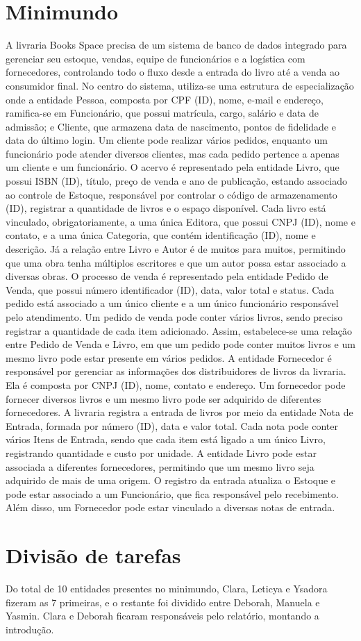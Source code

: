 \documentclass{article}
\begin{document}
\section{Minimundo}
A livraria Books Space precisa de um sistema de banco de dados integrado para gerenciar seu estoque, vendas, equipe de funcionários e a logística com fornecedores, controlando todo o fluxo desde a entrada do livro até a venda ao consumidor final. No centro do sistema, utiliza-se uma estrutura de especialização onde a entidade Pessoa, composta por CPF (ID), nome, e-mail e endereço, ramifica-se em Funcionário, que possui matrícula, cargo, salário e data de admissão; e Cliente, que armazena data de nascimento, pontos de fidelidade e data do último login. Um cliente pode realizar vários pedidos, enquanto um funcionário pode atender diversos clientes, mas cada pedido pertence a apenas um cliente e um funcionário. O acervo é representado pela entidade Livro, que possui ISBN (ID), título, preço de venda e ano de publicação, estando associado ao controle de Estoque, responsável por controlar o código de armazenamento (ID), registrar a quantidade de livros e o espaço disponível. Cada livro está vinculado, obrigatoriamente, a uma única Editora, que possui CNPJ (ID), nome e contato, e a uma única Categoria, que contém identificação (ID), nome e descrição. Já a relação entre Livro e Autor é de muitos para muitos, permitindo que uma obra tenha múltiplos escritores e que um autor possa estar associado a diversas obras. O processo de venda é representado pela entidade Pedido de Venda, que possui número identificador (ID), data, valor total e status. Cada pedido está associado a um único cliente e a um único funcionário responsável pelo atendimento. Um pedido de venda pode conter vários livros, sendo preciso registrar a quantidade de cada item adicionado. Assim, estabelece-se uma relação entre Pedido de Venda e Livro, em que um pedido pode conter muitos livros e um mesmo livro pode estar presente em vários pedidos. A entidade Fornecedor é responsável por gerenciar as informações dos distribuidores de livros da livraria. Ela é composta por CNPJ (ID), nome, contato e endereço. Um fornecedor pode fornecer diversos livros e um mesmo livro pode ser adquirido de diferentes fornecedores. A livraria registra a entrada de livros por meio da entidade Nota de Entrada, formada por número (ID), data e valor total. Cada nota pode conter vários Itens de Entrada, sendo que cada item está ligado a um único Livro, registrando quantidade e custo por unidade. A entidade Livro pode estar associada a diferentes fornecedores, permitindo que um mesmo livro seja adquirido de mais de uma origem. O registro da entrada atualiza o Estoque e pode estar associado a um Funcionário, que fica responsável pelo recebimento. Além disso, um Fornecedor pode estar vinculado a diversas notas de entrada. 
 
\section{Divisão de tarefas}
Do total de 10 entidades presentes no minimundo, Clara, Leticya e Ysadora fizeram as 7 primeiras, e o restante foi dividido entre Deborah, Manuela e Yasmin. Clara e Deborah ficaram responsáveis pelo relatório, montando a introdução.



\newpage
\end{document}
